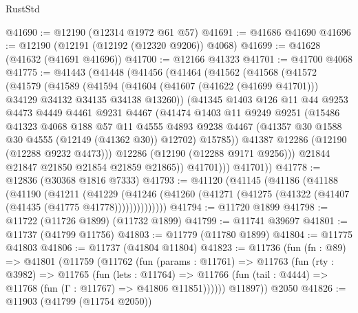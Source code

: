 \begin{lexlean}{RustStd}
\begin{coremodule}
@41690 := @12190 (@12314 @1972 @61 @57)
@41691 := @41686 @41690
@41696 := @12190 (@12191 (@12192 (@12320 @9206)) @4068)
@41699 := @41628 (@41632 (@41691 @41696))
@41700 := @12166 @41323
@41701 := @41700 @4068
@41775 := @41443
    (@41448
      (@41456
        (@41464
          (@41562
            (@41568
              (@41572
                (@41579
                  (@41589
                    (@41594
                      (@41604 (@41607 (@41622 (@41699 @41701))) @34129 @34132 @34135 @34138 @13260))
                    (@41345
                      @1403
                      @126
                      @11
                      @44
                      @9253
                      @4473
                      @4449
                      @4461
                      @9231
                      @4467
                      (@41474
                        @1403
                        @11
                        @9249
                        @9251
                        (@15486
                          @41323
                          @4068
                          @188
                          @57
                          @11
                          @4555
                          @4893
                          @9238
                          @4467
                          (@41357 @30 @1588 @30 @4555 (@12149 (@41362 @30)) @12702)
                          @15785))
                      @41387
                      @12286
                      (@12190 (@12288 @9232 @4473)))
                    @12286
                    (@12190 (@12288 @9171 @9256)))
                  @21844
                  @21847
                  @21850
                  @21854
                  @21859
                  @21865))
              @41701)))
        @41701))
@41778 := @12836 (@30368 @1816 @7333)
@41793 := @41120
    (@41145
      (@41186
        (@41188
          (@41190
            (@41211
              (@41229
                (@41246 (@41260 (@41271 (@41275 (@41322 (@41407 (@41435 (@41775 @41778))))))))))))))
@41794 := @11720 @1899
@41798 := @11722 (@11726 @1899) (@11732 @1899)
@41799 := @11741 @39697
@41801 := @11737 (@41799 @11756)
@41803 := @11779 (@11780 @1899)
@41804 := @11775 @41803
@41806 := @11737 (@41804 @11804)
@41823 := @11736
    (fun (fn : @89) =>
    @41801
      (@11759
        (@11762
          (fun (params : @11761) =>
          @11763
            (fun (rty : @3982) =>
            @11765
              (fun (lets : @11764) =>
              @11766 (fun (tail : @4444) => @11768 (fun (Γ : @11767) => @41806 @11851))))))
        @11897))
    @2050
@41826 := @11903 (@41799 (@11754 @2050))

\end{coremodule}
\end{lexlean}
